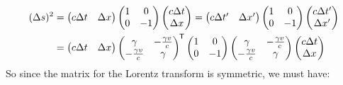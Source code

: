 \documentclass[../main.tex]{subfiles}
\begin{document}
\begin{align*}
  (\Delta s)^2 &= \begin{pmatrix}
  c \Delta t & \Delta x \\
  \end{pmatrix} \begin{pmatrix}
  1 & 0 \\
  0 & -1 \\
  \end{pmatrix} \begin{pmatrix}
  c \Delta t \\
  \Delta x \\
  \end{pmatrix} = \begin{pmatrix}
  c \Delta t' & \Delta x' \\
  \end{pmatrix} \begin{pmatrix}
  1 & 0 \\
  0 & -1 \\
  \end{pmatrix} \begin{pmatrix}
  c \Delta t' \\
  \Delta x' \\
  \end{pmatrix} \\
  &= \begin{pmatrix}
  c\Delta t & \Delta x \\
  \end{pmatrix} \begin{pmatrix}
  \gamma & - \frac{\gamma v}{c} \\
  - \frac{\gamma v}{c} & \gamma \\
  \end{pmatrix}^{{\mkern-1.5mu\mathsf{T}}} \begin{pmatrix}
  1 & 0 \\
  0 & -1 \\
  \end{pmatrix} \begin{pmatrix}
  \gamma & - \frac{\gamma v}{c} \\
  - \frac{\gamma v}{c} & \gamma \\
  \end{pmatrix} \begin{pmatrix}
  c\Delta t \\
  \Delta x \\
  \end{pmatrix}
\end{align*}
So since the matrix for the Lorentz transform is symmetric, we must have:
\end{document}
